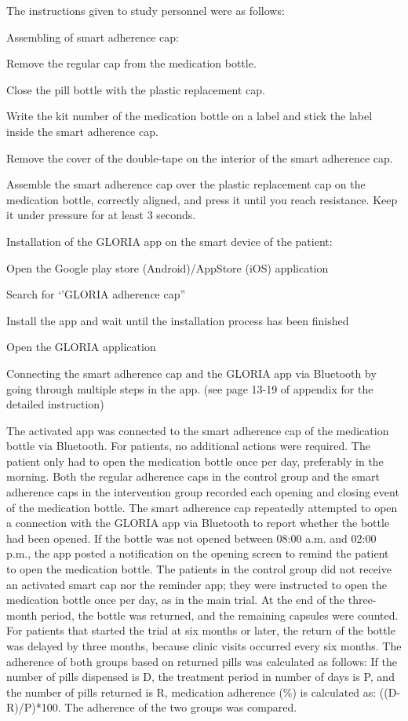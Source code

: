 \documentclass{article}
\begin{document}
The instructions given to study personnel were as follows:

Assembling of smart adherence cap: 

Remove the regular cap from the medication bottle. 

Close the pill bottle with the plastic replacement cap.

Write the kit number of the medication bottle on a label and stick the label inside the smart adherence cap.

Remove the cover of the double-tape on the interior of the smart adherence cap.

Assemble the smart adherence cap over the plastic replacement cap on the medication bottle, correctly aligned, and press it until you reach resistance. Keep it under pressure for at least 3 seconds. 

Installation of the GLORIA app on the smart device of the patient:

Open the Google play store (Android)/AppStore (iOS) application

Search for ‘'GLORIA adherence cap''

Install the app and wait until the installation process has been finished

Open the GLORIA application

Connecting the smart adherence cap and the GLORIA app via Bluetooth by going through multiple steps in the app. (see page 13-19 of appendix for the detailed instruction)



The activated app was connected to the smart adherence cap of the medication bottle via Bluetooth. For patients, no additional actions were required. The patient only had to open the medication bottle once per day, preferably in the morning. Both the regular adherence caps in the control group and the smart adherence caps in the intervention group recorded each opening and closing event of the medication bottle. The smart adherence cap repeatedly attempted to open a connection with the GLORIA app via Bluetooth to report whether the bottle had been opened. If the bottle was not opened between 08:00 a.m. and 02:00 p.m., the app posted a notification on the opening screen to remind the patient to open the medication bottle. The patients in the control group did not receive an activated smart cap nor the reminder app; they were instructed to open the medication bottle once per day, as in the main trial. At the end of the three-month period, the bottle was returned, and the remaining capsules were counted. For patients that started the trial at six months or later, the return of the bottle was delayed by three months, because clinic visits occurred every six months. The adherence of both groups based on returned pills was calculated as follows: If the number of pills dispensed is D, the treatment period in number of days is P, and the number of pills returned is R, medication adherence (\%) is calculated as: ((D-R)/P)*100. The adherence of the two groups was compared. 
\end{document}
